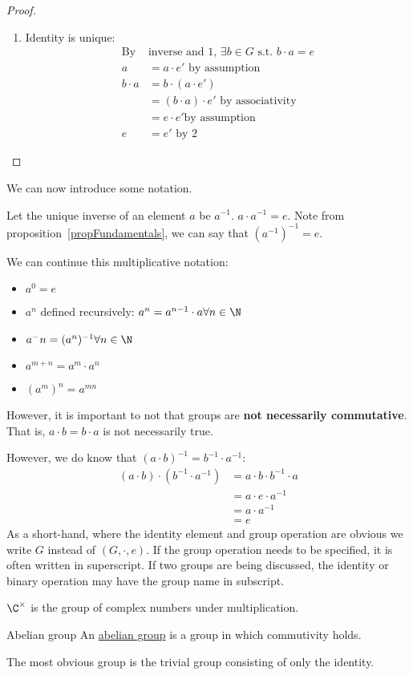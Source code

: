 \documentclass[../Main.tex]{subfiles}
\begin{document}
\begin{proof}
\begin{enumerate}
        \item Identity is unique:
        \begin{align*}
            \text{By }&\text{inverse and 1, } \exists b \in G \text{ s.t. } b \cdot a = e \\
            a &= a \cdot e' \text{ by assumption} \\
            b \cdot a &= b \cdot (a \cdot e') \\
            &= (b \cdot a) \cdot e' \text{ by associativity} \\
            &= e \cdot e' \text{by assumption} \\
            e &= e' \text{ by 2}
        \end{align*}
    \end{enumerate}
\end{proof}
We can now introduce some notation.\par
Let the unique inverse of an element $a$ be $a^{-1}$. $a \cdot a^{-1} = e$. Note from proposition~\ref{propFundamentals}, we can say that $(a^{-1})^{-1} = e$.\par
We can continue this multiplicative notation:
\begin{itemize}
    \item $a^0 = e$
    \item $a^n$ defined recursively: $a^n = a^{n-1} \cdot a \forall n \in \N$
    \item $a^-n = (a^n)^{-1} \forall n \in \N$
    \item $a^{m+n} = a^m \cdot a^n$
    \item $(a^m)^n = a^{mn}$
\end{itemize}
However, it is important to not that groups are \textbf{not necessarily commutative}. That is, $a \cdot b = b \cdot a$ is not necessarily true.\par
However, we do know that $(a \cdot b)^{-1} = b^{-1} \cdot a^{-1}$:
\begin{align*}
    (a \cdot b) \cdot (b^{-1} \cdot a^{-1}) &= a \cdot b \cdot b^{-1} \cdot a \\
    &= a \cdot e \cdot a^{-1} \\
    &= a \cdot a^{-1} \\
    &= e
\end{align*}
As a short-hand, where the identity element and group operation are obvious we write $G$ instead of $(G, \cdot, e)$. If the group operation needs to be specified, it is often written in superscript. If two groups are being discussed, the identity or binary operation may have the group name in subscript.
\begin{example}
    $\Ccross$ is the group of complex numbers under multiplication.
\end{example}
\begin{definition}{Abelian group}
    An \underline{abelian group} is a group in which commutivity holds.
\end{definition}
The most obvious group is the trivial group consisting of only the identity.
\end{document}
